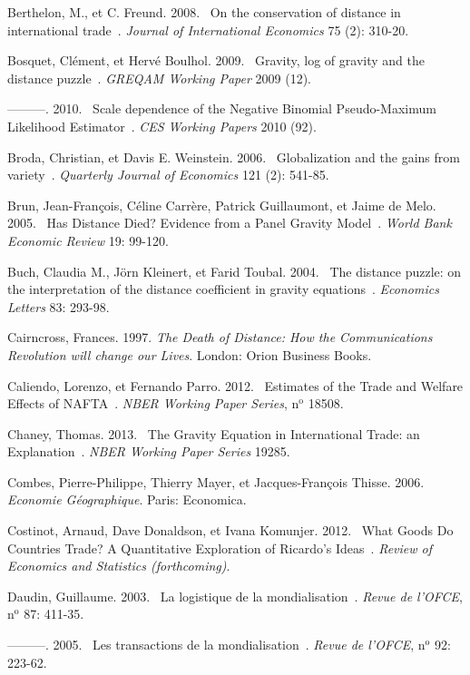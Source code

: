 \documentclass[12pt,twoside,a4paper,notitlepage]{article}
\begin{document}
Berthelon, M., et C. Freund. 2008. {\flqq}~On the conservation of distance in international trade~{\frqq}. \textit{Journal of International Economics} 75 (2): 310\hbox{-}20.

Bosquet, Cl\'{e}ment, et Herv\'{e} Boulhol. 2009. {\flqq}~Gravity, log of gravity and the distance puzzle~{\frqq}. \textit{GREQAM Working Paper} 2009 (12).

---------. 2010. {\flqq}~Scale dependence of the Negative Binomial Pseudo-Maximum Likelihood Estimator~{\frqq}. \textit{CES Working Papers} 2010 (92).

Broda, Christian, et Davis E. Weinstein. 2006. {\flqq}~Globalization and the gains from variety~{\frqq}. \textit{Quarterly Journal of Economics} 121 (2): 541\hbox{-}85.

Brun, Jean-Fran\c{c}ois, C\'{e}line Carr\`{e}re, Patrick Guillaumont, et Jaime de Melo. 2005. {\flqq}~Has Distance Died? Evidence from a Panel Gravity Model~{\frqq}. \textit{World Bank Economic Review} 19: 99\hbox{-}120.

Buch, Claudia M., J\"{o}rn Kleinert, et Farid Toubal. 2004. {\flqq}~The distance puzzle: on the interpretation of the distance coefficient in gravity equations~{\frqq}. \textit{Economics Letters} 83: 293\hbox{-}98.

Cairncross, Frances. 1997. \textit{The Death of Distance: How the Communications Revolution will change our Lives}. London: Orion Business Books.

Caliendo, Lorenzo, et Fernando Parro. 2012. {\flqq}~Estimates of the Trade and Welfare Effects of NAFTA~{\frqq}. \textit{NBER Working Paper Series}, n$^{\mathrm{o}}$ 18508.

Chaney, Thomas. 2013. {\flqq}~The Gravity Equation in International Trade: an Explanation~{\frqq}. \textit{NBER Working Paper Series} 19285.

Combes, Pierre-Philippe, Thierry Mayer, et Jacques-Fran\c{c}ois Thisse. 2006. \textit{Economie G\'{e}ographique}. Paris: Economica.

Costinot, Arnaud, Dave Donaldson, et Ivana Komunjer. 2012. {\flqq}~What Goods Do Countries Trade? A Quantitative Exploration of Ricardo's Ideas~{\frqq}. \textit{Review of Economics and Statistics (forthcoming)}.

Daudin, Guillaume. 2003. {\flqq}~La logistique de la mondialisation~{\frqq}. \textit{Revue de l'OFCE}, n$^{\mathrm{o}}$ 87: 411\hbox{-}35.

---------. 2005. {\flqq}~Les transactions de la mondialisation~{\frqq}. \textit{Revue de l'OFCE}, n$^{\mathrm{o}}$ 92: 223\hbox{-}62.
\end{document}
